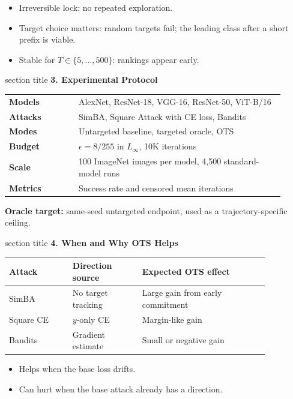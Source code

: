 \documentclass[final]{beamer}
\newlength{\postercontentwidth}
\newcommand{\sechead}[2]{%
  \vspace{0.46cm}
  \begin{beamercolorbox}[wd=\linewidth,sep=0.19cm,leftskip=0.24cm]{section title}
    {\Large\bfseries #1. #2}
  \end{beamercolorbox}
  \vspace{0.24cm}
}
\newcommand{\tightitems}{%
  \setlength\itemsep{0.13em}%
  \setlength\parskip{0pt}%
  \setlength\parsep{0pt}%
  \setlength\topsep{0pt}%
  \setlength\partopsep{0pt}%
}
\begin{document}
\begin{frame}[t]
{\begin{minipage}{\postercontentwidth}
\begin{minipage}[t]{0.485\linewidth}
\begin{itemize}
  \tightitems
  \item Irreversible lock: no repeated exploration.
  \item Target choice matters: random targets fail; the leading class after a short prefix is viable.
  \item Stable for $T\in\{5,\ldots,500\}$: rankings appear early.
\end{itemize}

\sechead{3}{Experimental Protocol}
\begin{center}
\begin{tabular}{@{}>{\bfseries}p{0.23\linewidth}p{0.68\linewidth}@{}}
\toprule
Models & AlexNet, ResNet-18, VGG-16, ResNet-50, ViT-B/16 \\
Attacks & SimBA, Square Attack with CE loss, Bandits \\
Modes & Untargeted baseline, targeted oracle, OTS \\
Budget & $\epsilon=8/255$ in $L_\infty$, 10K iterations \\
Scale & 100 ImageNet images per model, 4,500 standard-model runs \\
Metrics & Success rate and censored mean iterations \\
\bottomrule
\end{tabular}
\end{center}

\textbf{Oracle target:} same-seed untargeted endpoint, used as a trajectory-specific ceiling.

\sechead{4}{When and Why OTS Helps}
\begin{center}
\begin{tabular}{@{}p{0.21\linewidth}p{0.23\linewidth}p{0.42\linewidth}@{}}
\toprule
Attack & Direction source & Expected OTS effect \\
\midrule
SimBA & No target tracking & Large gain from early commitment \\
Square CE & $y$-only CE & Margin-like gain \\
Bandits & Gradient estimate & Small or negative gain \\
\bottomrule
\end{tabular}
\end{center}

\begin{itemize}
  \tightitems
  \item Helps when the base loss drifts.
  \item Can hurt when the base attack already has a direction.
\end{itemize}


\end{minipage}
\end{minipage}}
\end{frame}
\end{document}
